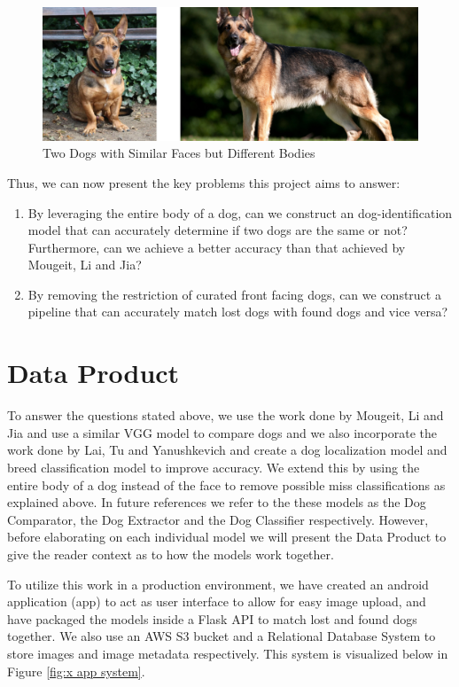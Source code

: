 \documentclass{article}
\begin{document}
\newpage

\begin{figure}[h]
\centering
	\includegraphics{final-report-images/different_bodies.png}
\caption{Two Dogs with Similar Faces but Different Bodies}
\label{fig:x different bodies}
\end{figure}

Thus, we can now present the key problems this project aims to answer:

\begin{enumerate}
  \item By leveraging the entire body of a dog, can we construct an dog-identification model that can accurately determine if two dogs are the same or not?  Furthermore, can we achieve a better accuracy than that achieved by Mougeit, Li and Jia?
  \item By removing the restriction of curated front facing dogs, can we construct a pipeline that can accurately match lost dogs with found dogs and vice versa? 
\end{enumerate}

\section{Data Product}

	To answer the questions stated above, we use the work done by Mougeit, Li and Jia and use a similar VGG model to compare dogs and we also incorporate the work done by Lai, Tu and Yanushkevich and create a dog localization model and breed classification model to improve accuracy.   We extend this by using the entire body of a dog instead of the face to remove possible miss classifications as explained above.  In future references we refer to the these models as the Dog Comparator, the Dog Extractor and the Dog Classifier respectively.  However, before elaborating on each individual model we will present the Data Product to give the reader context as to how the models work together.

	To utilize this work in a production environment, we have created an android application (app) to act as user interface to allow for easy image upload, and have packaged the models inside a Flask API to match lost and found dogs together. We also use an AWS S3 bucket and a Relational Database System to store images and image metadata respectively.  This system is visualized below in Figure \ref{fig:x app system}.
\end{document}
